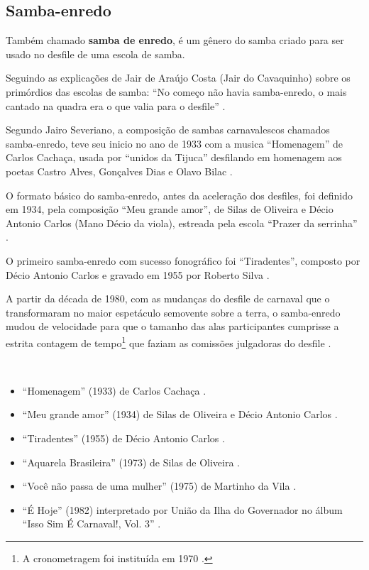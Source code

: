 \subsection{Samba-enredo}
Também chamado \textbf{samba de enredo}, é um gênero do samba criado para ser usado no desfile de uma escola de samba.

Seguindo as explicações de Jair de Araújo Costa (Jair do Cavaquinho) sobre os primórdios das escolas de samba: 
``No começo não havia samba-enredo, o mais cantado na quadra era o que valia para o desfile'' \cite[pp. 85]{de2003tem}.


Segundo Jairo Severiano, a composição de sambas carnavalescos chamados samba-enredo,
teve seu inicio no ano de 1933 com a musica ``Homenagem'' de Carlos Cachaça, usada por ``unidos da Tijuca''
desfilando em homenagem aos poetas Castro Alves, Gonçalves Dias e Olavo Bilac  \cite{rizzi2016musica}.

O formato básico do samba-enredo, antes da aceleração dos desfiles, foi definido em 1934, 
pela composição ``Meu grande amor'', 
de Silas de Oliveira e Décio Antonio Carlos (Mano Décio da viola), 
estreada pela escola ``Prazer da serrinha'' \cite[pp. 85-86]{de2003tem}.

O primeiro samba-enredo com sucesso fonográfico foi ``Tiradentes'', 
 composto por Décio Antonio Carlos e gravado em 1955 por Roberto Silva  \cite[pp. 86]{de2003tem}. 

A partir da década de 1980, 
com as mudanças do desfile de carnaval que o transformaram no maior espetáculo semovente sobre a terra, 
o samba-enredo mudou de velocidade para que o tamanho das alas participantes cumprisse 
a estrita contagem de tempo\footnote{A cronometragem foi instituída em 1970  \cite{rizzi2016musica}.} 
que faziam as comissões julgadoras do desfile \cite[pp. 88]{de2003tem} \cite{rizzi2016musica}.
\begin{example} ~

\begin{itemize}
\item ``Homenagem'' (1933) de Carlos Cachaça \cite{rizzi2016musica}.
\item ``Meu grande amor'' (1934) de Silas de Oliveira e Décio Antonio Carlos \cite[pp. 84-85]{de2003tem}.
\item ``Tiradentes'' (1955) de Décio Antonio Carlos  \cite[pp. 86]{de2003tem}.
\item ``Aquarela Brasileira'' (1973) de Silas de Oliveira \cite[pp. 123]{de2003tem} \cite[pp. 253]{diniz2006almanaque}.
\item ``Você não passa de uma mulher'' (1975) de Martinho da Vila \cite{martinhodavila} \cite[pp. 185]{diniz2006almanaque}.
\item ``É Hoje'' (1982) interpretado por União da Ilha do Governador no álbum ``Isso Sim É Carnaval!, Vol. 3'' \cite{subgenerosdosamba1}.
\end{itemize}
\end{example}


